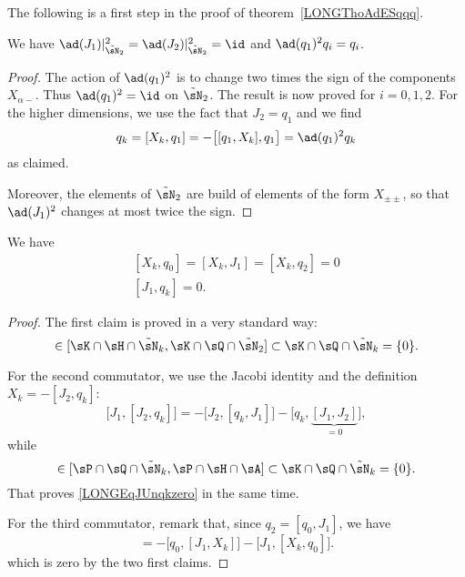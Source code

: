 The following is a first step in the proof of theorem~\ref{LONGThoAdESqqq}.
\begin{corollary}			\label{LONGCorAdQUncarreqi}
	We have $\ad(J_1)|_{\tilde\sN_2}^2=\ad(J_2)|_{\tilde\sN_2}^2=\id$ and $\ad(q_1)^2q_i=q_i$.
\end{corollary}

\begin{proof}
	The action of $\ad(q_1)^2$ is to change two times the sign of the components $X_{\alpha -}$. Thus $\ad(q_1)^2=\id$ on $\tilde\sN_2$. The result is now proved for $i=0,1,2$. For the higher dimensions, we use the fact that $J_2=q_1$ and we find
	\begin{equation}
		q_k=[X_k,q_1]=-\big[ [q_1,X_k],q_1 \big]=\ad(q_1)^2q_k
	\end{equation}
	as claimed.

	Moreover, the elements of $\tilde\sN_2$ are build of elements of the form $X_{\pm\pm}$, so that $\ad(J_1)^2$ changes at most twice the sign.

\end{proof}

\begin{lemma}		\label{LONGLemXkqzerozero}\label{LONGLemXkJunzero}
	We have
	\begin{subequations}
		\begin{align}
			[X_k,q_0]=[X_k,J_1]=[X_k,q_2]=0\\
			[J_1,q_k]=0.		\label{LONGEqJUnqkzero}
		\end{align}
	\end{subequations}
\end{lemma}

\begin{proof}
	The first claim is proved in a very standard way:
	\begin{equation}
		[X_k,q_0]\in[\sK\cap\sH\cap\tilde\sN_k,\sK\cap\sQ\cap\tilde\sN_2]\subset\sK\cap\sQ\cap\tilde\sN_k=\{ 0 \}.
	\end{equation}

	For the second commutator, we use the Jacobi identity and the definition $X_k=-[J_2,q_k]$:
	\begin{equation}		\label{LONGEqJ1J2qkzero}
		\big[ J_1,[J_2,q_k] \big]=-\big[ J_2,[q_k,J_1] \big]-\big[ q_k,\underbrace{[J_1,J_2]}_{=0} \big],
	\end{equation}
	while
	\begin{equation}
		[q_k,J_1]\in[\sP\cap\sQ\cap\tilde\sN_k,\sP\cap\sH\cap\sA]\subset\sK\cap\sQ\cap\tilde\sN_k=\{ 0 \}.
	\end{equation}
	That proves \eqref{LONGEqJUnqkzero} in the same time.

	For the third commutator, remark that, since $q_2=[q_0,J_1]$, we have
	\begin{equation}
		[X_k,q_2]=-\big[ q_0,[J_1,X_k] \big]-\big[ J_1,[X_k,q_0] \big].
	\end{equation}
	which is zero by the two first claims.
\end{proof}

